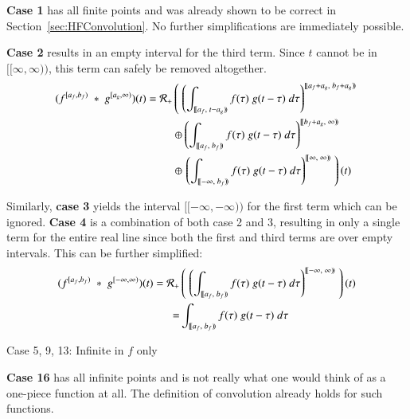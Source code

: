 \textbf{Case 1} has all finite points and was already shown to be correct in Section~\ref{sec:HFConvolution}.
No further simplifications are immediately possible.

\textbf{Case 2} results in an empty interval for the third term.
Since $t$ cannot be in $[\![\infty, \infty )\!)$, this term can safely be removed altogether.
\begin{align*}
	(f^{[a_f,b_f)} \;*\; g^{[a_g,\infty)}) (t) = 
		\R[+] &\left( \; \left( 
			\int_{[\![a_f,\;t-a_g)\!)} f(\tau) \; g(t-\tau) \; d\tau \right)^{[\![a_f+a_g,\; b_f+a_g)\!)} 
				\right. \\ &\oplus \left( 
			\int_{[\![a_f,\;b_f)\!)} f(\tau) \; g(t-\tau) \; d\tau \right)^{[\![b_f+a_g,\; \infty)\!)} 
				\\ &\oplus \left. \left( 
			\int_{[\![-\infty,\;b_f)\!)} f(\tau) \; g(t-\tau) \; d\tau \right)^{[\![\infty,\; \infty)\!)} 
				\; \right)(t)
\end{align*}

Similarly, \textbf{case 3} yields the interval $[\![-\infty, -\infty)\!)$ for the first term which can be ignored.
\textbf{Case 4} is a combination of both case 2 and 3, resulting in only a single term for the entire real line since
both the first and third terms are over empty intervals.
This can be further simplified:
\begin{align*}
	(f^{[a_f,b_f)} \;*\; g^{[-\infty,\infty)}) (t) = 
		\R[+] &\left( \; \left( 
			\int_{[\![a_f,\;b_f)\!)} f(\tau) \; g(t-\tau) \; d\tau \right)^{[\![-\infty,\; \infty)\!)} 
		\; \right)(t) \\
		= & \int_{[\![a_f,\;b_f)\!)} f(\tau) \; g(t-\tau) \; d\tau
\end{align*}


Case 5, 9, 13: Infinite in $f$ only




\textbf{Case 16} has all infinite points and is not really what one would think of as a one-piece function at all.
The definition of convolution already holds for such functions.




